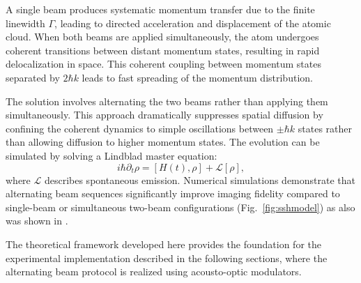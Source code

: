 A single beam produces systematic momentum transfer due to the finite linewidth $\Gamma$, leading to directed acceleration and displacement of the atomic cloud. When both beams are applied simultaneously, the atom undergoes coherent transitions between distant momentum states, resulting in rapid delocalization in space. This coherent coupling between momentum states separated by $2\hbar k$ leads to fast spreading of the momentum distribution.

The solution involves alternating the two beams rather than applying them simultaneously. This approach dramatically suppresses spatial diffusion by confining the coherent dynamics to simple oscillations between $\pm\hbar k$ states rather than allowing diffusion to higher momentum states. The evolution can be simulated by solving a Lindblad master equation:
\begin{equation}
i\hbar \partial_t \rho = [H(t), \rho] + \mathcal{L}[\rho],
\end{equation}
where $\mathcal{L}$ describes spontaneous emission. Numerical simulations demonstrate that alternating beam sequences significantly improve imaging fidelity compared to single-beam or simultaneous two-beam configurations (Fig.~\ref{fig:sshmodel}) as also was shown in \cite{su_fast_2025,bergschneider_spin-resolved_2018}.



The theoretical framework developed here provides the foundation for the experimental implementation described in the following sections, where the alternating beam protocol is realized using acousto-optic modulators.